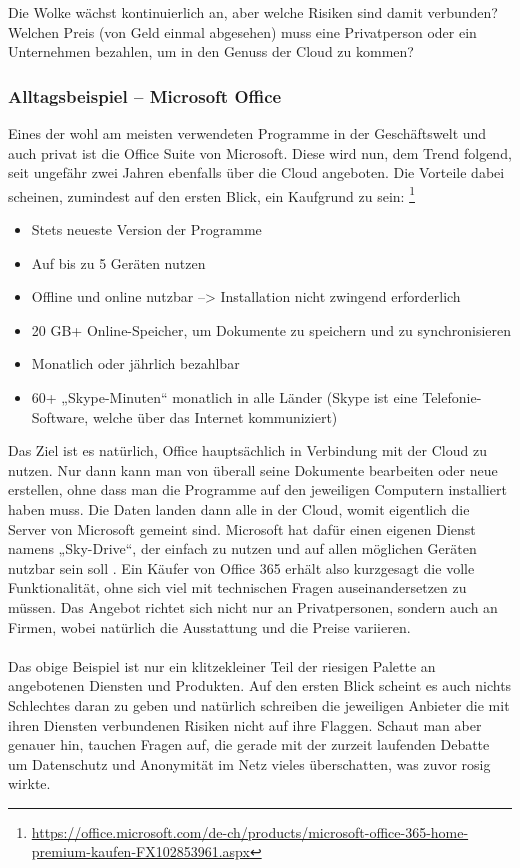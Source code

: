 Die Wolke wächst kontinuierlich an, aber welche Risiken sind damit verbunden? Welchen Preis (von Geld einmal abgesehen) muss eine Privatperson oder ein Unternehmen bezahlen, um in den Genuss der Cloud zu kommen?

\subsubsection{Alltagsbeispiel – Microsoft Office}
Eines der wohl am meisten verwendeten Programme in der Geschäftswelt und auch privat ist die Office Suite von Microsoft. Diese wird nun, dem Trend folgend, seit ungefähr zwei Jahren ebenfalls über die Cloud angeboten. Die Vorteile dabei scheinen, zumindest auf den ersten Blick, ein Kaufgrund zu sein: 
\footnote{\url{https://office.microsoft.com/de-ch/products/microsoft-office-365-home-premium-kaufen-FX102853961.aspx}}

\begin{itemize}
\item Stets neueste Version der Programme
\item Auf bis zu 5 Geräten nutzen
\item Offline und online nutzbar --> Installation nicht zwingend erforderlich
\item 20 GB+ Online-Speicher, um Dokumente zu speichern und zu synchronisieren
\item Monatlich oder jährlich bezahlbar
\item 60+ „Skype-Minuten“ monatlich in alle Länder (Skype ist eine Telefonie-Software, welche über das Internet kommuniziert)
\end{itemize}

Das Ziel ist es natürlich, Office hauptsächlich in Verbindung mit der Cloud zu nutzen. Nur dann kann man von überall seine Dokumente bearbeiten oder neue erstellen, ohne dass man die Programme auf den jeweiligen Computern installiert haben muss. Die Daten landen dann alle in der Cloud, womit eigentlich die Server von Microsoft gemeint sind. Microsoft hat dafür einen eigenen Dienst namens „Sky-Drive“, der einfach zu nutzen und auf allen möglichen Geräten nutzbar sein soll . Ein Käufer von Office 365 erhält also kurzgesagt die volle Funktionalität, ohne sich viel mit technischen Fragen auseinandersetzen zu müssen.
Das Angebot richtet sich nicht nur an Privatpersonen, sondern auch an Firmen, wobei natürlich die Ausstattung und die Preise variieren.
\\
\\
Das obige Beispiel ist nur ein klitzekleiner Teil der riesigen Palette an angebotenen Diensten und Produkten. Auf den ersten Blick scheint es auch nichts Schlechtes daran zu geben und natürlich schreiben die jeweiligen Anbieter die mit ihren Diensten verbundenen Risiken nicht auf ihre Flaggen. Schaut man aber genauer hin, tauchen Fragen auf, die gerade mit der zurzeit laufenden Debatte um Datenschutz und Anonymität im Netz vieles überschatten, was zuvor rosig wirkte.

